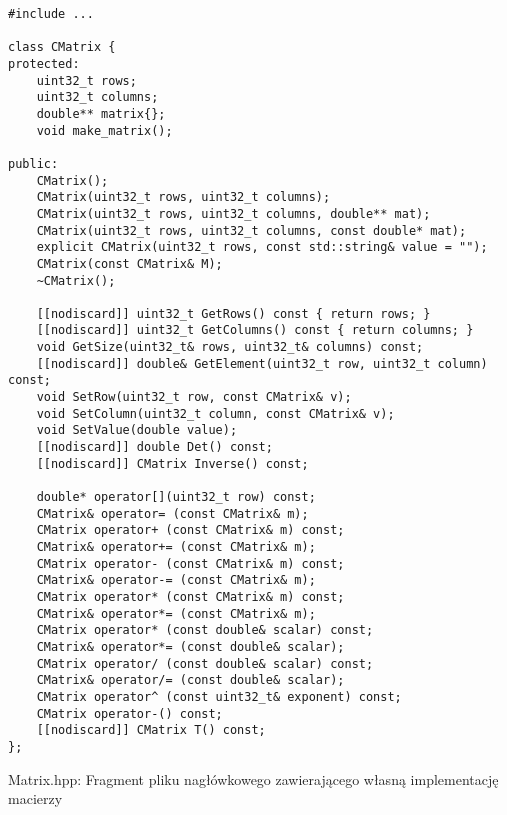 \begin{listing}[p]
\begin{verbatim}
#include ...

class CMatrix {
protected:
    uint32_t rows;
    uint32_t columns;
    double** matrix{};
    void make_matrix();

public:
    CMatrix();
    CMatrix(uint32_t rows, uint32_t columns);
    CMatrix(uint32_t rows, uint32_t columns, double** mat);
    CMatrix(uint32_t rows, uint32_t columns, const double* mat);
    explicit CMatrix(uint32_t rows, const std::string& value = "");
    CMatrix(const CMatrix& M);
    ~CMatrix();

    [[nodiscard]] uint32_t GetRows() const { return rows; }
    [[nodiscard]] uint32_t GetColumns() const { return columns; }
    void GetSize(uint32_t& rows, uint32_t& columns) const;
    [[nodiscard]] double& GetElement(uint32_t row, uint32_t column) const;
    void SetRow(uint32_t row, const CMatrix& v);
    void SetColumn(uint32_t column, const CMatrix& v);
    void SetValue(double value);
    [[nodiscard]] double Det() const;
    [[nodiscard]] CMatrix Inverse() const;

    double* operator[](uint32_t row) const;
    CMatrix& operator= (const CMatrix& m);
    CMatrix operator+ (const CMatrix& m) const;
    CMatrix& operator+= (const CMatrix& m);
    CMatrix operator- (const CMatrix& m) const;
    CMatrix& operator-= (const CMatrix& m);
    CMatrix operator* (const CMatrix& m) const;
    CMatrix& operator*= (const CMatrix& m);
    CMatrix operator* (const double& scalar) const;
    CMatrix& operator*= (const double& scalar);
    CMatrix operator/ (const double& scalar) const;
    CMatrix& operator/= (const double& scalar);
    CMatrix operator^ (const uint32_t& exponent) const;
    CMatrix operator-() const;
    [[nodiscard]] CMatrix T() const;
};
\end{verbatim}
\caption{Matrix.hpp: Fragment pliku nagłówkowego zawierającego własną implementację macierzy}
\label{lst:matrix_hpp}
\end{listing}


